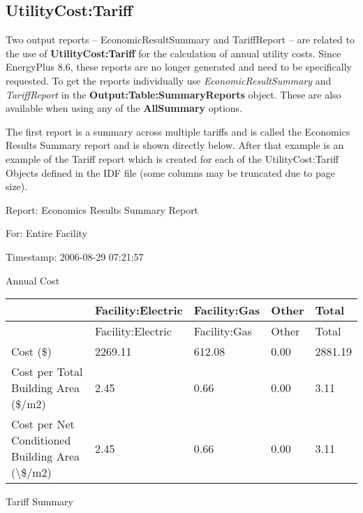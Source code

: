 \subsection{UtilityCost:Tariff}\label{utilitycosttariff}

Two output reports -- EconomicResultSummary and TariffReport -- are related to the use of \textbf{UtilityCost:Tariff} for the calculation of annual utility costs.
Since EnergyPlus 8.6, these reports are no longer generated and need to be specifically requested.
To get the reports individually use \emph{EconomicResultSummary} and \emph{TariffReport} in the \textbf{Output:Table:SummaryReports} object.
These are also available when using any of the \textbf{AllSummary} options.

The first report is a summary across multiple tariffs and is called the Economics Results Summary report and is shown directly below.
After that example is an example of the Tariff report which is created for each of the UtilityCost:Tariff Objects defined in the IDF file (some columns may be truncated due to page size).

Report: Economics Results Summary Report

For: Entire Facility

Timestamp: 2006-08-29 07:21:57

Annual Cost

\begin{longtable}[c]{>{\raggedright}p{1.2in}>{\raggedright}p{1.2in}>{\raggedright}p{1.2in}>{\raggedright}p{1.2in}>{\raggedright}p{1.2in}}
\toprule 
~ & Facility:Electric & Facility:Gas & Other & Total \tabularnewline
\midrule
\endfirsthead

\toprule 
~ & Facility:Electric & Facility:Gas & Other & Total \tabularnewline
\midrule
\endhead

Cost (\$) & 2269.11 & 612.08 & 0.00 & 2881.19 \tabularnewline
Cost per Total Building Area (\$/m2) & 2.45 & 0.66 & 0.00 & 3.11 \tabularnewline
Cost per Net Conditioned Building Area (\textbackslash\$/m2) & 2.45 & 0.66 & 0.00 & 3.11 \tabularnewline
\bottomrule
\end{longtable}

Tariff Summary

